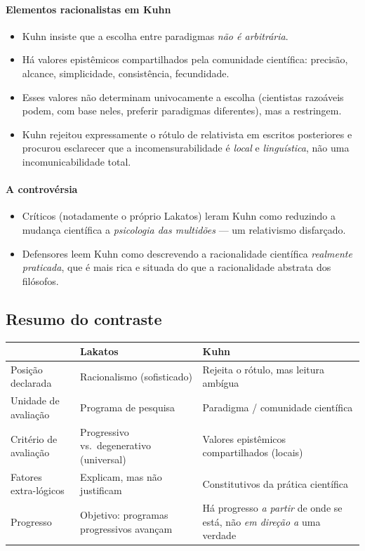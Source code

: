 \documentclass[9pt,a4paper]{extarticle}
\newcommand{\impt}[1]{\textcolor{important}{#1}}
\begin{document}
\paragraph{Elementos racionalistas em Kuhn}
\begin{itemize}
    \item Kuhn insiste que a escolha entre paradigmas \emph{não é arbitrária}.
    \item Há \impt{valores epistêmicos compartilhados} pela comunidade científica: precisão, alcance, simplicidade, consistência, fecundidade.
    \item Esses valores não determinam univocamente a escolha (cientistas razoáveis podem, com base neles, preferir paradigmas diferentes), mas a restringem.
    \item Kuhn rejeitou expressamente o rótulo de relativista em escritos posteriores e procurou esclarecer que a incomensurabilidade é \emph{local} e \emph{linguística}, não uma incomunicabilidade total.
\end{itemize}

\paragraph{A controvérsia}
\begin{itemize}
    \item Críticos (notadamente o próprio Lakatos) leram Kuhn como reduzindo a mudança científica a \emph{psicologia das multidões} --- um relativismo disfarçado.
    \item Defensores leem Kuhn como descrevendo a racionalidade científica \emph{realmente praticada}, que é mais rica e situada do que a racionalidade abstrata dos filósofos.
\end{itemize}

\subsection{Resumo do contraste}

\begin{center}
\begin{tabularx}{\linewidth}{@{} l X X @{}}
\toprule
 & \textbf{Lakatos} & \textbf{Kuhn} \\
\midrule
Posição declarada & Racionalismo (sofisticado) & Rejeita o rótulo, mas leitura ambígua \\
Unidade de avaliação & Programa de pesquisa & Paradigma / comunidade científica \\
Critério de avaliação & Progressivo vs.\ degenerativo (universal) & Valores epistêmicos compartilhados (locais) \\
Fatores extra-lógicos & Explicam, mas não justificam & Constitutivos da prática científica \\
Progresso & Objetivo: programas progressivos avançam & Há progresso \emph{a partir} de onde se está, não \emph{em direção a} uma verdade \\
\bottomrule
\end{tabularx}
\end{center}
\end{document}
